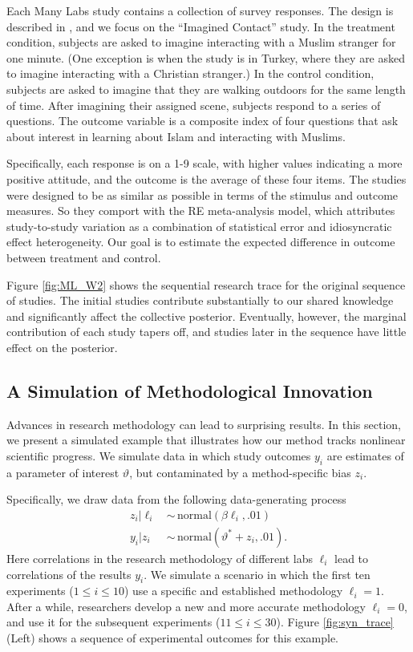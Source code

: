 Each Many Labs study contains a collection of survey responses. The
design is described in \citep{Klein_2014}, and we focus on the
``Imagined Contact'' study. In the treatment condition, subjects are
asked to imagine interacting with a Muslim stranger for one
minute. (One exception is when the study is in Turkey, where they are
asked to imagine interacting with a Christian stranger.) In the control
condition, subjects are asked to imagine that they are walking
outdoors for the same length of time. After imagining their assigned
scene, subjects respond to a series of questions. The outcome variable
is a composite index of four questions that ask about interest in
learning about Islam and interacting with Muslims.

Specifically, each response is on a 1-9 scale, with higher values
indicating a more positive attitude, and the outcome is the average of
these four items. The studies were designed to be as similar as
possible in terms of the stimulus and outcome measures. So they
comport with the RE meta-analysis model, which attributes
study-to-study variation as a combination of statistical error and
idiosyncratic effect heterogeneity. Our goal is to estimate the
expected difference in outcome between treatment and control.

Figure \ref{fig:ML_W2} shows the sequential research trace for the
original sequence of studies. The initial studies contribute
substantially to our shared knowledge and significantly affect the
collective posterior. Eventually, however, the marginal contribution
of each study tapers off, and studies later in the sequence have
little effect on the posterior.

\subsection{A Simulation of Methodological Innovation}
\label{Sec:ToyExample}


Advances in research methodology can lead to surprising results. In
this section, we present a simulated example that illustrates how our
method tracks nonlinear scientific progress.  We simulate data in which
study outcomes $y_i$ are estimates of a parameter of interest
$\vartheta$, but contaminated by a method-specific bias $z_i$.

Specifically, we draw data from the following data-generating process
\begin{align}
   z_i \lvert \ell_i \, &\sim  \, \text{normal}(\beta \ell_i,.01) \\ \nonumber
   y_i \lvert z_i \, &\sim \, \text{normal}(\vartheta^* + z_i,.01).    
\end{align}
Here correlations in the research methodology of different labs
$\ell_i$ lead to correlations of the results $y_i$. We simulate a
scenario in which the first ten experiments ($1 \leq i \leq 10$) use a
specific and established methodology $\ell_i = 1$. After a while,
researchers develop a new and more accurate methodology $\ell_i = 0$,
and use it for the subsequent experiments ($11 \leq i \leq 30$). Figure \ref{fig:syn_trace} (Left) shows a sequence of 
experimental outcomes for this example.

